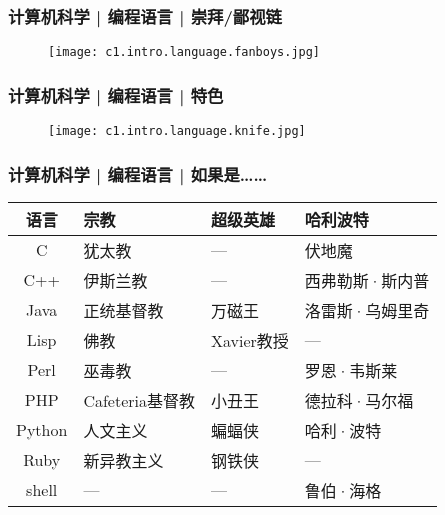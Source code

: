 \begin{frame}
  \frametitle{计算机科学 | 编程语言 | 崇拜/鄙视链}
  \begin{figure}
    \centering
    \texttt{[image: c1.intro.language.fanboys.jpg]}
  \end{figure}
\end{frame}

\begin{frame}
  \frametitle{计算机科学 | 编程语言 | 特色}
  \begin{figure}
    \centering
    \texttt{[image: c1.intro.language.knife.jpg]}
  \end{figure}
\end{frame}

\begin{frame}
  \frametitle{计算机科学 | 编程语言 | 如果是……}
  \begin{table}
    \centering
    \begin{tabular}{clll}
      \hline
      \rowcolor{blue!50}语言 & 宗教 & 超级英雄 & 哈利波特\\
      \hline
      C & 犹太教 & --- & 伏地魔\\
      C++ & 伊斯兰教 & --- & 西弗勒斯·斯内普\\
      Java & 正统基督教 & 万磁王 & 洛雷斯·乌姆里奇\\
      Lisp & 佛教 & Xavier教授 & ---\\
      Perl & 巫毒教 & --- & 罗恩·韦斯莱\\
      PHP & Cafeteria基督教 & 小丑王 & 德拉科·马尔福\\
      Python & 人文主义 & 蝙蝠侠 & 哈利·波特\\
      Ruby & 新异教主义 & 钢铁侠 & ---\\
      shell & --- & --- & 鲁伯·海格\\
      \hline
    \end{tabular}
  \end{table}
\end{frame}

